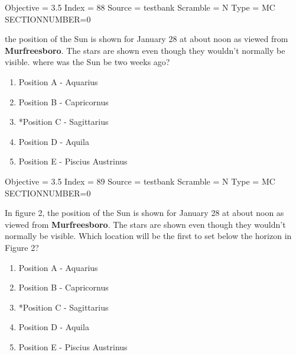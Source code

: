 \documentclass[11pt]{article}
\begin{document}
\begin{enumerate}
\begin{minipage}{\textwidth}
\begin{minipage}{\textwidth}
Objective = 3.5
Index = 88
Source = testbank
Scramble = N
Type = MC
SECTIONNUMBER=0
\end{minipage}
\end{minipage}
\vskip 0.20in

\begin{minipage}{\textwidth}
\begin{minipage}{\textwidth}
\item the position of the Sun is shown for January 28 at about noon as viewed from {\bf Murfreesboro}.  The stars are shown even though they wouldn't normally be visible. where was the Sun be two weeks ago?
\begin{multicols}{2}
\begin{enumerate} 
\setlength{\itemsep}{1pt} 
\setlength{\parskip}{0pt} 
\setlength{\parsep}{0pt}
\setlength{\multicolsep}{1pt} 
\item Position A - Aquarius
\item Position B - Capricornus
\item *Position C - Sagittarius
\item Position D - Aquila
\item Position E - Piscius Austrinus
\end{enumerate} 
\vfill 
\end{multicols}

Objective = 3.5
Index = 89
Source = testbank
Scramble = N
Type = MC
SECTIONNUMBER=0
\end{minipage}
\end{minipage}
\vskip 0.20in

\begin{minipage}{\textwidth}
\begin{minipage}{\textwidth}
\item In figure 2, the position of the Sun is shown for January 28 at about noon as viewed from {\bf Murfreesboro}.  The stars are shown even though they wouldn't normally be visible.  Which location will be the first to set below the horizon in Figure 2?
\begin{multicols}{2}
\begin{enumerate} 
\setlength{\itemsep}{1pt} 
\setlength{\parskip}{0pt} 
\setlength{\parsep}{0pt}
\setlength{\multicolsep}{1pt} 
\item Position A - Aquarius
\item Position B - Capricornus
\item *Position C - Sagittarius
\item Position D - Aquila
\item Position E - Piscius Austrinus
\end{enumerate} 
\vfill 
\end{multicols}


\end{minipage}
\end{minipage}
\end{enumerate}
\end{document}
